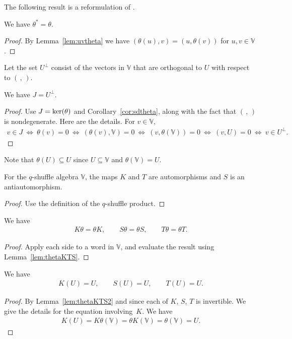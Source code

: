 The following result is a reformulation of \cite[Theorem~4.5]{green}.
\begin{Corollary}\label{cor:sdtheta}
We have $\theta^*=\theta$.
\end{Corollary}
\begin{proof} By Lemma~\ref{lem:uvtheta} we have $(\theta(u),v)= (u, \theta(v))$ for $u,v \in \mathbb V$.
\end{proof}

Let the set $U^\perp$ consist of the vectors in $\mathbb V$ that are orthogonal to $U$ with respect to
 $(\,,\,)$.
\begin{Lemma}\label{lem:ds}We have $J=U^\perp$.
\end{Lemma}
\begin{proof} Use $J={\rm ker}(\theta)$ and
Corollary~\ref{cor:sdtheta}, along with the fact that $(\,,\,)$ is nondegenerate.
Here are the details. For $v \in \mathbb V$,
\begin{gather*}
v \in J \ \Leftrightarrow\
\theta(v)=0 \ \Leftrightarrow \
( \theta(v),\mathbb V)=0\ \Leftrightarrow \
(v, \theta(\mathbb V))=0 \ \Leftrightarrow\
(v,U)=0 \ \Leftrightarrow \ v \in U^\perp.\tag*{\qed}
\end{gather*}\renewcommand{\qed}{}
\end{proof}

Note that $\theta(U)\subseteq U$ since $U \subseteq \mathbb V$ and $\theta(\mathbb V)=U$.

\begin{Lemma}\label{lem:thetaKTS}For the $q$-shuffle algebra $\mathbb V$, the maps $K$ and $T$
are automorphisms and $S$ is an antiautomorphism.
\end{Lemma}
\begin{proof}Use the definition of the $q$-shuffle product.
\end{proof}

\begin{Lemma}\label{lem:thetaKTS2}We have
\begin{gather*}
K \theta = \theta K, \qquad
S \theta = \theta S, \qquad
T \theta = \theta T.
\end{gather*}
\end{Lemma}
\begin{proof} Apply each side to a word in $\mathbb V$, and evaluate the result using Lemma~\ref{lem:thetaKTS}.
\end{proof}

\begin{Lemma}\label{lem:KSTU}We have
\begin{gather*}
 K (U) = U, \qquad S (U) = U, \qquad T (U) = U.
\end{gather*}
\end{Lemma}
\begin{proof} By Lemma~\ref{lem:thetaKTS2} and since each of $K$, $S$, $T$ is invertible. We give the details for the equation involving~$K$. We have
\begin{gather*}
K(U) = K \theta (\mathbb V) = \theta K(\mathbb V) = \theta(\mathbb V) = U.\tag*{\qed}
\end{gather*}\renewcommand{\qed}{}
\end{proof}

